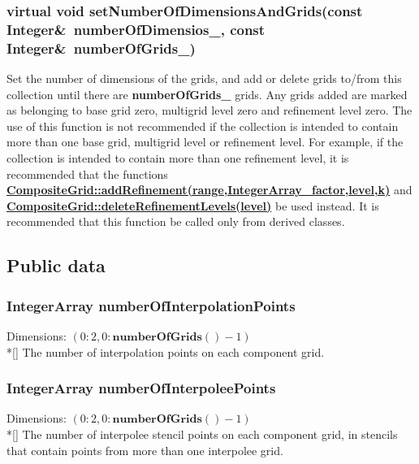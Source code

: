 \documentclass{article}
\begin{document}
  \subsubsection{virtual void setNumberOfDimensionsAndGrids(const Integer\&~numberOfDimensios\_, const Integer\&~numberOfGrids\_)}
  \label{CompositeGrid::setNumberOfDimensionsAndGrids(numberOfDimensions_, numberOfGrids_)}
    Set the number of dimensions of the grids, and add or delete grids to/from this collection until there are \textbf{numberOfGrids\_} grids.
    Any grids added are marked as belonging to base grid zero, multigrid level zero and refinement level zero.
    The use of this function is not recommended if the collection is intended to contain more than one
    base grid, multigrid level or refinement level.  For example,
    if the collection is intended to contain more than one refinement level, it is recommended that the functions
    {\bf{}\hyperref{addRefinement(range,factor,level,k)}{addRefinement(range,factor,level,k) \rm(\S}{)}{CompositeGrid::addRefinement(range,IntegerArray_factor,level,k)}} and
    {\bf{}\hyperref{deleteRefinementLevels(level)}{deleteRefinementLevels(level) \rm(\S}{)}{CompositeGrid::deleteRefinementLevels(level)}}
    be used instead.
    It is recommended that this function be called only from derived classes.

\subsection{Public data}
\label{CompositeGrid::PublicData}

  \subsubsection{IntegerArray numberOfInterpolationPoints}
  \label{CompositeGrid::numberOfInterpolationPoints}
    Dimensions: $(0\colon2,0\colon\textbf{numberOfGrids}()-1)$ \\*[\parskip]
    The number of interpolation points on each component grid.

  \subsubsection{IntegerArray numberOfInterpoleePoints}
  \label{CompositeGrid::numberOfInterpoleePoints}
    Dimensions: $(0\colon2,0\colon\textbf{numberOfGrids}()-1)$ \\*[\parskip]
    The number of interpolee stencil points on each component grid, in stencils that contain points from more than one interpolee grid.
\end{document}
